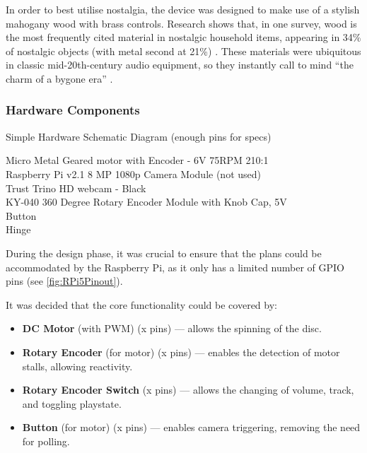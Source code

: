             In order to best utilise nostalgia, the device was designed to make use of a stylish mahogany wood with brass controls. Research shows that, in one survey, wood is the most frequently cited material in nostalgic household items, appearing in 34\% of nostalgic objects (with metal second at 21\%) \cite{Skinner2022}. These materials were ubiquitous in classic mid-20th-century audio equipment, so they instantly call to mind ``the charm of a bygone era'' \cite{LookInTheAttic2024}.
    
            \subsubsection{Hardware Components}
    
                \begin{temp}
                    Simple Hardware Schematic Diagram (enough pins for specs)
    
                    Micro Metal Geared motor with Encoder - 6V 75RPM 210:1 \\ %
                    Raspberry Pi v2.1 8 MP 1080p Camera Module (not used) \\ %
                    Trust Trino HD webcam - Black \\ %
                    KY-040 360 Degree Rotary Encoder Module with Knob Cap, 5V  \\ %
                    Button \\
                    Hinge
                \end{temp}
    
                During the design phase, it was crucial to ensure that the plans could be accommodated by the Raspberry Pi, as it only has a limited number of GPIO pins (see \ref{fig:RPi5Pinout}).
    
                It was decided that the core functionality could be covered by:
    
                \begin{itemize}
                    \item \textbf{DC Motor} (with PWM) (x pins) --- allows the spinning of the disc.
                    \item \textbf{Rotary Encoder} (for motor) (x pins) --- enables the detection of motor stalls, allowing reactivity.
                    \item \textbf{Rotary Encoder Switch} (x pins) --- allows the changing of volume, track, and toggling playstate.
                    \item \textbf{Button} (for motor) (x pins) --- enables camera triggering, removing the need for polling.
                \end{itemize}
    
